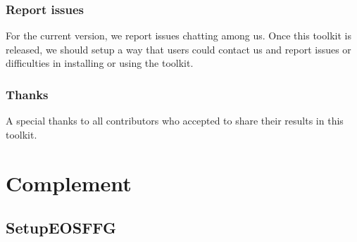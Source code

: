 \documentclass[letterpaper,10pt,english]{sphinxmanual}
\begin{document}
\subsection{Report issues}
\label{\detokenize{source/miscelaneous:report-issues}}\label{\detokenize{source/miscelaneous:id3}}
\sphinxAtStartPar
For the current version, we report issues chatting among us.
Once this toolkit is released, we should setup a way that users could contact us and report issues or difficulties in installing or using the toolkit.


\subsection{Thanks}
\label{\detokenize{source/miscelaneous:thanks}}\label{\detokenize{source/miscelaneous:id4}}
\sphinxAtStartPar
A special thanks to all contributors who accepted to share their results in this toolkit.


\chapter{Complement}
\label{\detokenize{index:complement}}
\sphinxstepscope


\section{SetupEOSFFG}
\label{\detokenize{source/api/setup_eos_ffg:setupeosffg}}\label{\detokenize{source/api/setup_eos_ffg::doc}}\label{\detokenize{source/api/setup_eos_ffg:module-nucleardatapy.setup_eos_ffg}}
\end{document}
